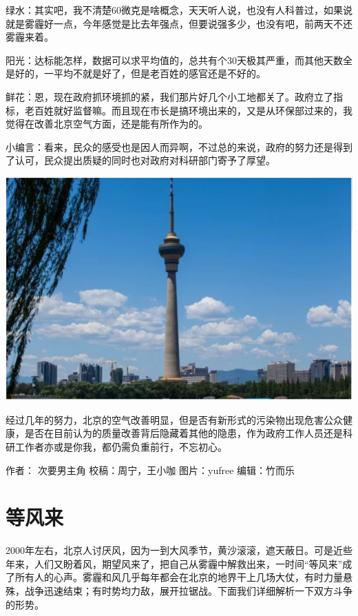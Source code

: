 \documentclass[
]{book}
\begin{document}
绿水：其实吧，我不清楚60微克是啥概念，天天听人说，也没有人科普过，如果说就是雾霾好一点，今年感觉是比去年强点，但要说强多少，也没有吧，前两天不还雾霾来着。

阳光：达标能怎样，数据可以求平均值的，总共有个30天极其严重，而其他天数全是好的，一平均不就是好了，但是老百姓的感官还是不好的。

鲜花：恩，现在政府抓环境抓的紧，我们那片好几个小工地都关了。政府立了指标，老百姓就好监督嘛。而且现在市长是搞环境出来的，又是从环保部过来的，我觉得在改善北京空气方面，还是能有所作为的。

小编言：看来，民众的感受也是因人而异啊，不过总的来说，政府的努力还是得到了认可，民众提出质疑的同时也对政府对科研部门寄予了厚望。

\includegraphics[width=8.33in]{images/air5}

经过几年的努力，北京的空气改善明显，但是否有新形式的污染物出现危害公众健康，是否在目前认为的质量改善背后隐藏着其他的隐患，作为政府工作人员还是科研工作者亦或是你我，都仍需负重前行，不忘初心。

作者： 次要男主角
校稿：周宁，王小咖
图片：yufree
编辑：竹而乐

\hypertarget{ux7b49ux98ceux6765}{%
\section{等风来}\label{ux7b49ux98ceux6765}}

2000年左右，北京人讨厌风，因为一到大风季节，黄沙滚滚，遮天蔽日。可是近些年来，人们又盼着风，期望风来了，把自己从雾霾中解救出来，一时间``等风来''成了所有人的心声。雾霾和风几乎每年都会在北京的地界干上几场大仗，有时力量悬殊，战争迅速结束；有时势均力敌，展开拉锯战。下面我们详细解析一下双方斗争的形势。
\end{document}

